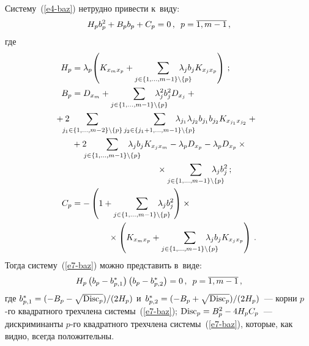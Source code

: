 \begin{multicols}{2}
  Систему~(\ref{e4-baz}) нетрудно привести к~виду:
  \begin{equation}
  H_p b_p^2 +B_p b_p +C_p=0\,,\enskip p=\overline{1,m-1}\,,
  \label{e7-baz}
  \end{equation}
  где 
 \begin{align*}
  H_p&=\lambda_p\!\left( K_{x_mx_p}+\sum\limits_{j\in \{1,\ldots, m-1\}\backslash \{p\}} 
\!\!\!\!\!\!\!\!\!\!\lambda_j b_j K_{x_jx_p}\right)\,;
 \\
  B_p&=D_{x_m}+\sum\limits_{ j\in \{1,\ldots, m-1\}\backslash\{p\}} \!\!\!\!\!\!\!\!\!\!\lambda_j^2 b_j^2 
D_{x_j} + {}\\
  &\hspace*{-20pt}{}+ 2\!\!\!\!\!\!\sum\limits_{ j_1\in \{1,\ldots, m-2\}\backslash \{p\}} \sum\limits_{ j_2\in 
\{j_1+1,\ldots, m-1\}\backslash \{p\}}\!\!\!\!\!\!\!\!\!\!\!\!\!\!\!
 \lambda_{j_1} \lambda_{j_2} b_{j_1} b_{j_2} 
K_{x_{j_1} x_{j_2}}+{}\\
  &{}+2\!\!\! \sum\limits_{ j\in \{1,\ldots, m-1\}\backslash \{p\}} \!\!\!\!\!\!\!\!\!\!\lambda_jb_jK_{x_jx_m}-
\lambda_pD_{x_p} -\lambda_p D_{x_p} \times{}\\
&\hspace*{35mm}{}\times \sum\limits_{ j\in \{1,\ldots, m-1\}\backslash 
\{p\}} \!\!\!\!\!\!\!\!\!\!\lambda_j b_j^2\,;
  \\
  C_p&=-\left( 1+\sum\limits_{ j\in \{1,\ldots, m-1\}\backslash \{p\}}  \!\!\!\!\!\!\!\!\!\!
\lambda_jb_j^2\right)\times{}\\
&\hspace*{15mm}{}\times \left( K_{x_mx_p} +\sum\limits_{ j\in \{1,\ldots, m-1\}\backslash 
\{p\}} \!\!\!\!\!\!\!\!\!\!\lambda_j b_j K_{x_j x_p}\right)\,.
  \end{align*}
    Тогда систему~(\ref{e7-baz}) можно представить в~виде:
  \begin{equation}
  H_p\left( b_p-b^*_{p,1}\right) \left( b_p-b^*_{p,2}\right)=0\,,\enskip 
p=\overline{1,m-1}\,,
  \label{e8-baz}
  \end{equation}
где $b_{p,1}^*\hm= (-B_p-\sqrt{\mathrm{Disc}_p})/(2H_p)$ и~$b^*_{p,2}\hm= 
(-B_p\hm+\sqrt{\mathrm{Disc}_p})/(2H_p)$~--- корни $p$-го квадратного трехчлена 
системы~(\ref{e7-baz}); $\mathrm{Disc}_p\hm= B_p^2\hm- 4H_p C_p$~---  
дискриминанты $p$-го квадратного трехчлена системы~(\ref{e7-baz}), которые, 
как видно, всегда положительны.


\end{multicols}
